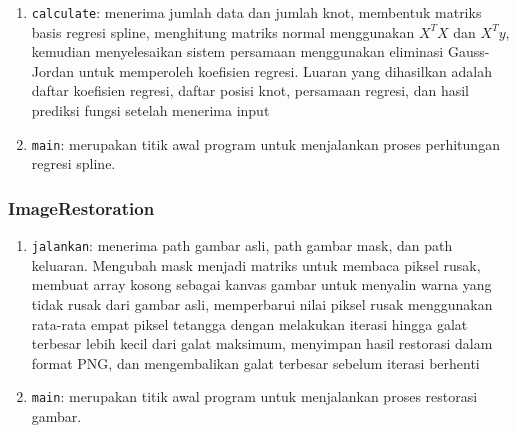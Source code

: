 \documentclass{article}
\begin{document}
\begin{enumerate}

    \item{\texttt{calculate}: menerima jumlah data dan jumlah knot, membentuk matriks basis regresi spline, menghitung matriks normal menggunakan \(X^T X\) dan \(X^T y\), kemudian menyelesaikan sistem persamaan menggunakan eliminasi Gauss-Jordan untuk memperoleh koefisien regresi. Luaran yang dihasilkan adalah daftar koefisien regresi, daftar posisi knot, persamaan regresi, dan hasil prediksi fungsi setelah menerima input}

    \item{\texttt{main}: merupakan titik awal program untuk menjalankan proses perhitungan regresi spline.}

\end{enumerate}


\subsubsection{ImageRestoration}


\begin{enumerate}

    \item{\texttt{jalankan}: menerima path gambar asli, path gambar mask, dan path keluaran. Mengubah mask menjadi matriks untuk membaca piksel rusak, membuat array kosong sebagai kanvas gambar untuk menyalin warna yang tidak rusak dari gambar asli, memperbarui nilai piksel rusak menggunakan rata-rata empat piksel tetangga dengan melakukan iterasi hingga galat terbesar lebih kecil dari galat maksimum, menyimpan hasil restorasi dalam format PNG, dan mengembalikan galat terbesar sebelum iterasi berhenti}

    \item{\texttt{main}: merupakan titik awal program untuk menjalankan proses restorasi gambar.}

\end{enumerate}
\end{document}
